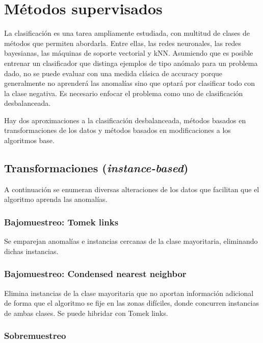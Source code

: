 \documentclass[a4paper,11pt,spanish]{report}
\let\stdsection\section
\let\stdsub\subsection
\let\stdsubsub\subsubsection
\renewcommand{\chapter}{\stdsection}
\renewcommand{\section}{\stdsub}
\renewcommand{\subsection}{\stdsubsub}
\begin{document}
\chapter{Métodos supervisados}
\label{sec-2-2}

La clasificación es una tarea ampliamente estudiada, con multitud de clases de métodos que permiten abordarla. Entre ellas, las redes neuronales, las redes bayesianas, las máquinas de soporte vectorial y kNN. Asumiendo que es posible entrenar un clasificador que distinga ejemplos de tipo anómalo para un problema dado, no se puede evaluar con una medida clásica de accuracy porque generalmente no aprenderá las anomalías sino que optará por clasificar todo con la clase negativa. Es necesario enfocar el problema como uno de clasificación desbalanceada.

Hay dos aproximaciones a la clasificación desbalanceada, métodos basados en transformaciones de los datos y métodos basados en modificaciones a los algoritmos base.

\section{Transformaciones (\emph{instance-based})}
\label{sec-2-2-1}

A continuación se enumeran diversas alteraciones de los datos que facilitan que el algoritmo aprenda las anomalías.

\subsection*{Bajomuestreo: Tomek links}
\label{sec-2-2-1-1}

Se emparejan anomalías e instancias cercanas de la clase mayoritaria, eliminando dichas instancias.

\subsection*{Bajomuestreo: Condensed nearest neighbor}
\label{sec-2-2-1-2}

Elimina instancias de la clase mayoritaria que no aportan información adicional de forma que el algoritmo se fije en las zonas difíciles, donde concurren instancias de ambas clases. Se puede hibridar con Tomek links.

\subsection*{Sobremuestreo}
\label{sec-2-2-1-3}
\end{document}
